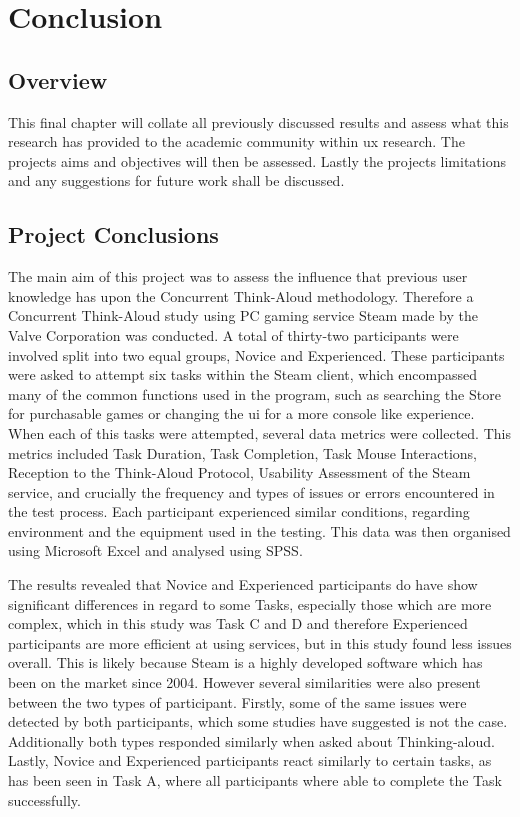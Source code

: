 
\chapter{Conclusion}

\section{Overview}
This final chapter will collate all previously discussed results and assess what this research has provided to the academic community within \gls{ux} research. The projects aims and objectives will then be assessed. Lastly the projects limitations and any suggestions for future work shall be discussed.

\section{Project Conclusions}
The main aim of this project was to assess the influence that previous user knowledge has upon the Concurrent Think-Aloud methodology. Therefore a Concurrent Think-Aloud study using PC gaming service Steam made by the Valve Corporation was conducted. A total of thirty-two participants were involved split into two equal groups, Novice and Experienced. These participants were asked to attempt six tasks within the Steam client, which encompassed many of the common functions used in the program, such as searching the Store for purchasable games or changing the \gls{ui} for a more console like experience. When each of this tasks were attempted, several data metrics were collected. This metrics included Task Duration, Task Completion, Task Mouse Interactions, Reception to the Think-Aloud Protocol, Usability Assessment of the Steam service, and crucially the frequency and types of issues or errors encountered in the test process. Each participant experienced similar conditions, regarding environment and the equipment used in the testing. This data was then organised using Microsoft Excel and analysed using SPSS.

The results revealed that Novice and Experienced participants do have show significant differences in regard to some Tasks, especially those which are more complex, which in this study was Task C and D and therefore Experienced participants are more efficient at using services, but in this study found less issues overall. This is likely because Steam is a highly developed software which has been on the market since 2004. However several similarities were also present between the two types of participant. Firstly, some of the same issues were detected by both participants, which some studies have suggested is not the case. Additionally both types responded similarly when asked about Thinking-aloud. Lastly, Novice and Experienced participants react similarly to certain tasks, as has been seen in Task A, where all participants where able to complete the Task successfully. 

